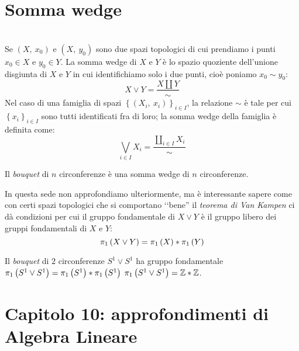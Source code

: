 \section{Somma wedge}
\begin{define}~{}\\
	Se $\left(X,\ x_0\right)$ e $\left(X,\ y_0\right)$ sono due spazi topologici di cui prendiamo i punti $x_0\in X$ e $y_0\in Y$. La somma wedge di $X$ e $Y$ è lo spazio quoziente dell'unione disgiunta di $X$ e $Y$ in cui identifichiamo solo i due punti, cioè poniamo $x_0\sim y_0$:
	\begin{equation}
		X\vee Y=\frac{X\amalg Y}{\sim}
	\end{equation}
Nel caso di una famiglia di spazi $\left\{\left(X_i,\ x_i\right)\right\}_{i\in I}$, la relazione $\sim$ è tale per cui $\left\{x_i\right\}_{i\in I}$ sono tutti identificati fra di loro; la somma wedge della famiglia è definita come:
\begin{equation*}
	\bigvee_{i\in I} X_i = \frac{\coprod_{i\in I}X_i}{\sim}
\end{equation*}
\end{define}
\begin{example}
	Il \textit{bouquet} di $n$ circonferenze è una somma wedge di $n$ circonferenze.
\end{example}
In questa sede non approfondiamo ulteriormente, ma è interessante sapere come con certi spazi topologici che si comportano ‘‘bene'' il \textit{teorema di Van Kampen} ci dà condizioni per cui il gruppo fondamentale di $X\vee Y$ è il gruppo libero dei gruppi fondamentali di $X$ e $Y$:
\begin{equation}
	\gruf{X\vee Y}{\ }=\gruf{X}{\ }\ast\gruf{Y}{\ }
\end{equation}
\begin{example}
	Il \textit{bouquet} di $2$ circonferenze $S^1\vee S^1$ ha gruppo fondamentale $\gruf{S^1\vee S^1}{\ }=\gruf{S^1}{\ }\ast\gruf{S^1}{\ }$  $\gruf{S^1\vee S^1}{\ }=\integerset\ast\integerset$.
\end{example}
\section{Capitolo 10: approfondimenti di Algebra Lineare}
